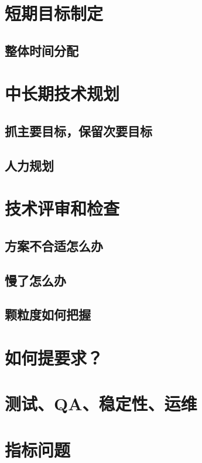 
\section{短期目标制定} %
\subsection{整体时间分配}

\section{中长期技术规划}
\subsection{抓主要目标，保留次要目标}
\subsection{人力规划}

\section{技术评审和检查}
\subsection{方案不合适怎么办}
\subsection{慢了怎么办}
\subsection{颗粒度如何把握}

\section{如何提要求？}

\section{测试、QA、稳定性、运维}

\section{指标问题}
